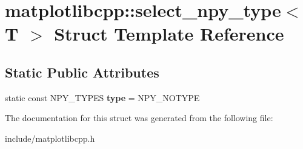 \hypertarget{structmatplotlibcpp_1_1select__npy__type}{}\section{matplotlibcpp\+:\+:select\+\_\+npy\+\_\+type$<$ T $>$ Struct Template Reference}
\label{structmatplotlibcpp_1_1select__npy__type}
\subsection*{Static Public Attributes}
\begin{DoxyCompactItemize}
\item 
static const N\+P\+Y\+\_\+\+T\+Y\+P\+ES {\bfseries type} = N\+P\+Y\+\_\+\+N\+O\+T\+Y\+PE\hypertarget{structmatplotlibcpp_1_1select__npy__type_acbffa4e6e1d047b52e12330446816c9c}{}\label{structmatplotlibcpp_1_1select__npy__type_acbffa4e6e1d047b52e12330446816c9c}

\end{DoxyCompactItemize}


The documentation for this struct was generated from the following file\+:\begin{DoxyCompactItemize}
\item 
include/matplotlibcpp.\+h\end{DoxyCompactItemize}
